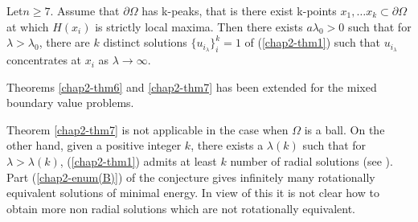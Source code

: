 \begin{theorem}\label{chap2-thm7}
Let\pageoriginale $n\geq 7$. Assume that $\partial \Omega$ has k-peaks, that is there exist k-points ${x_{1}, \ldots x_{k}} \subset \partial\Omega$ at which $H(x_{i})$ is strictly local maxima. Then there exists $a \lambda_{0} > 0$ such that for $\lambda > \lambda_{0}$, there are $k$ distinct solutions $\{u_{i_{\lambda}}\}_{i}^{k} = 1$ of (\ref{chap2-thm1}) such that $u_{i_{\lambda}}$ concentrates at $x_{i}$ as $\lambda \rightarrow \infty$.
\end{theorem}
Theorems \ref{chap2-thm6} and \ref{chap2-thm7} has been extended for the mixed boundary value problems.

Theorem \ref{chap2-thm7} is not applicable in the case when $\Omega$ is a ball. On the other hand, given a positive integer $k$, there exists a $\lambda(k)$ such that for $\lambda > \lambda(k)$, (\ref{chap2-thm1}) admits at least $k$ number of radial solutions (see \cite{chap2-key18}). Part (\ref{chap2-enum(B)}) of the conjecture gives infinitely many rotationally equivalent solutions of minimal energy. In view of this it is not clear how to obtain more non radial solutions which are not rotationally equivalent. 
 
